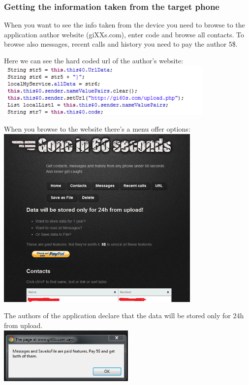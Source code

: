 \subsubsection{Getting the information taken from the target phone}
When you want to see the info taken from the device you need to browse to the application author website (giXXs.com), enter code and browse all contacts. To browse also messages, recent calls and history you need to pay the author 5\$.

\parbox{\textwidth}{
Here we can see the hard coded url of the author's website: \\
\includegraphics[width=0.8\textwidth]{figs/gone60_12.png}
}

\parbox{\textwidth}{
When you browse to the website there's a menu offer options: \\
\includegraphics[width=0.75\textwidth]{figs/gone60_13.png}
}

\parbox{\textwidth}{
The authors of the application declare that the data will be stored only for 24h from upload. \\
\includegraphics[width=0.5\textwidth]{figs/gone60_14.png}
}


